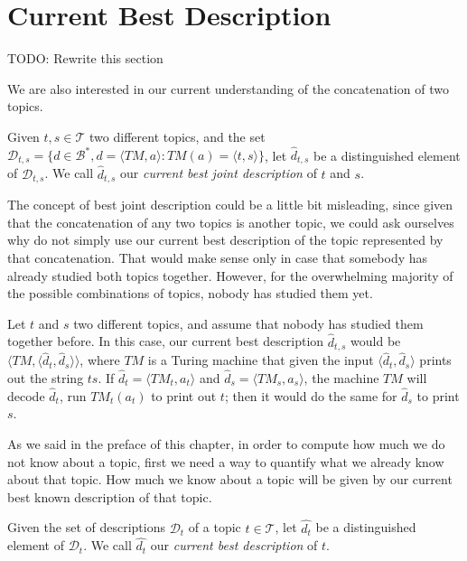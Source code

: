 %
%

\section{Current Best Description}

{\color{red} TODO: Rewrite this section}

We are also interested in our current understanding of the concatenation of two topics.

\begin{definition}
Given $t,s \in \mathcal{T}$ two different topics, and the set $\mathcal{D}_{t,s} = \{ d \in \mathcal{B}^\ast, d = \langle TM,a \rangle : TM(a) = \langle t,s \rangle \}$, let $\hat{d}_{t,s}$ be a distinguished element of $\mathcal{D}_{t,s}$. We call $\hat{d}_{t,s}$ our \emph{current best joint description} of $t$ and $s$.
\end{definition}

The concept of best joint description could be a little bit misleading, since given that the concatenation of any two topics is another topic, we could ask ourselves why do not simply use our current best description of the topic represented by that concatenation. That would make sense only in case that somebody has already studied both topics together. However, for the overwhelming majority of the possible combinations of topics, nobody has studied them yet.

\begin{example}
\label{ex:unknown_join}
Let $t$ and $s$ two different topics, and assume that nobody has studied them together before. In this case, our current best description $\hat{d}_{t, s}$ would be $\langle TM, \langle \hat{d}_t, \hat{d}_s \rangle \rangle$, where $TM$ is a Turing machine that given the input $\langle \hat{d}_t, \hat{d}_s \rangle$ prints out the string $ts$. If $\hat{d}_t = \langle TM_t, a_t \rangle$ and $\hat{d}_s = \langle TM_s, a_s \rangle$, the machine $TM$ will decode $\hat{d}_t$, run $TM_t(a_t)$ to print out $t$; then it would do the same for $\hat{d}_s$ to print $s$.
\end{example}

As we said in the preface of this chapter, in order to compute how much we do not know about a topic, first we need a way to quantify what we already know about that topic. How much we know about a topic will be given by our current best known description of that topic.

\begin{definition}
Given the set of descriptions $\mathcal{D}_t$ of a topic $t \in \mathcal{T}$, let $\hat{d_{t}}$ be a distinguished element of $\mathcal{D}_t$. We call $\hat{d_{t}}$ our \emph{current best description} of $t$.
\end{definition}

